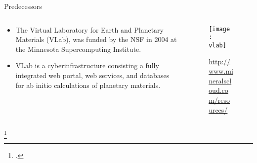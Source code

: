 \begin{frame}{Predecessors}


    \begin{columns}[t]
        \begin{column}{0.4\textwidth}
            \begin{itemize}
                \item The Virtual Laboratory for Earth and Planetary Materials (VLab), was
                      funded by the NSF in 2004 at the Minnesota Supercomputing Institute.
                \item VLab is a cyberinfrastructure consisting a fully integrated web
                      portal, web services, and databases for ab initio calculations of
                      planetary materials.
            \end{itemize}
        \end{column}

        \begin{column}{0.6\textwidth}
            \begin{figure}
                \centering
                \texttt{[image: vlab]}
                \caption{\url{http://www.mineralscloud.com/resources/}\footnotemark}
            \end{figure}
        \end{column}
    \end{columns}
    \footcitetext{DASILVA2007321}
\end{frame}
